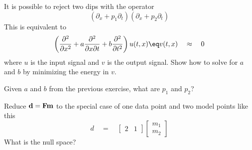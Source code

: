 \begin{exer}
\item It is possible to reject two dips with the operator
\begin{equation}
(\partial_x + p_1 \partial_t)(\partial_x + p_2 \partial_t)
\end{equation}
This is equivalent to
\begin{equation}
\left(
\frac{\partial^2}{\partial x^2} + a \frac{\partial^2}{\partial x \partial t} + b \frac{\partial^2}{\partial t^2} 
\right)
u(t,x) \eq v(t,x) \quad \approx \quad 0
\end{equation}
where $u$ is the input signal and $v$ is the output signal.  Show how to solve for $a$ and $b$ by minimizing the energy in $v$.

\item Given $a$ and $b$ from the previous exercise, what are $p_1$ and $p_2$?

\item
Reduce $\bold d =\bold F\bold m$ to the special case of one data point and two model points like this
\begin{equation}
d \quad =\quad
\left[
\begin{array}{cc}
2 & 1
\end{array}
\right]
\left[
\begin{array}{c}
m_1
\\
m_2
\end{array}
\right]
\end{equation}
What is the null space?


\end{exer}
